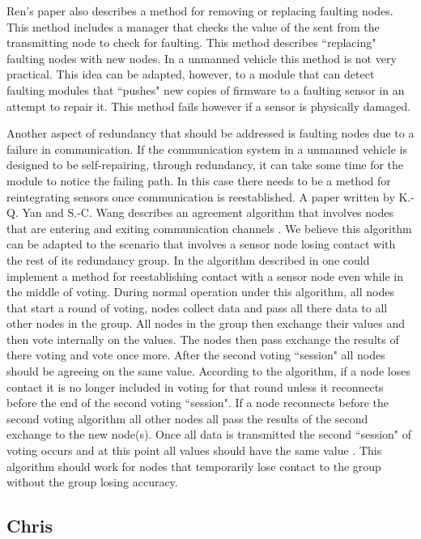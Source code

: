 \documentclass[twoside, conference]{IEEEtran}
\begin{document}
Ren's paper also describes a method for removing or replacing faulting nodes. This method includes a manager that checks the value of the sent from the transmitting node to check for faulting. This method describes ``replacing" faulting nodes with new nodes. In a unmanned vehicle this method is not very practical. This idea can be adapted, however, to a module that can detect faulting modules that ``pushes" new copies of firmware to a faulting sensor in an attempt to repair it. This method fails however if a sensor is physically damaged.\cite{Ren2001}

Another aspect of redundancy that should be addressed is faulting nodes due to a failure in communication. If the communication system in a unmanned vehicle is designed to be self-repairing, through redundancy, it can take some time for the module to notice the failing path. In this case there needs to be a method for reintegrating sensors once communication is reestablished. A paper written by K.-Q. Yan and S.-C. Wang describes an agreement algorithm that involves nodes that are entering and exiting communication channels \cite{Yan2007}. We believe this algorithm can be adapted to the scenario that involves a sensor node losing contact with the rest of its redundancy group. In the algorithm described in \cite{Yan2007} one could implement a method for reestablishing contact with a sensor node even while in the middle of voting. During normal operation under this algorithm, all nodes that start a round of voting, nodes collect data and pass all there data to all other nodes in the group. All nodes in the group then exchange their values and then vote internally on the values. The nodes then pass exchange the results of there voting and vote once more. After the second voting ``session" all nodes should be agreeing on the same value. According to the algorithm, if a node loses contact it is no longer included in voting for that round unless it reconnects before the end of the second voting ``session". If a node reconnects before the second voting algorithm all other nodes all pass the results of the second exchange to the new node(s). Once all data is transmitted the second ``session" of voting occurs and at this point all values should have the same value \cite{Yan2007}. This algorithm should work for nodes that temporarily lose contact to the group without the group losing accuracy.

\subsection{Chris}
\end{document}
